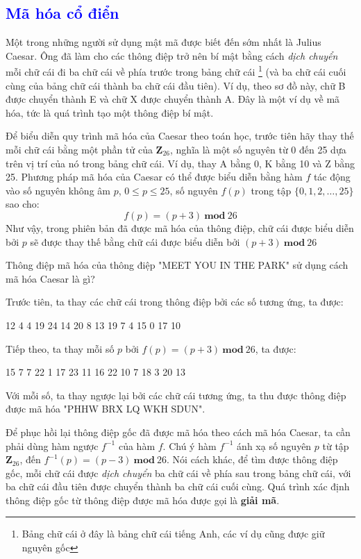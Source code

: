 \textcolor{blue}{\section{Mã hóa cổ điển}}
Một trong những người sử dụng mật mã được biết đến sớm nhất là Julius Caesar. Ông đã làm cho các thông điệp trở nên bí mật bằng cách \textit{dịch chuyển} mỗi chữ cái đi ba chữ cái về phía trước trong bảng chữ cái \footnote{Bảng chữ cái ở đây là bảng chữ cái tiếng Anh, các ví dụ cũng được giữ nguyên gốc} (và ba chữ cái cuối cùng của bảng chữ cái thành ba chữ cái đầu tiên). Ví dụ, theo sơ đồ này, chữ B được chuyển thành E và chữ X được chuyển thành A. Đây là một ví dụ về mã hóa, tức là quá trình tạo một thông điệp bí mật.

Để biểu diễn quy trình mã hóa của Caesar theo toán học, trước tiên hãy thay thế mỗi chữ cái bằng một phần tử của $ \mathbf{Z}_{26} $, nghĩa là một số nguyên từ 0 đến 25 dựa trên vị trí của nó trong bảng chữ cái. Ví dụ, thay A bằng 0, K bằng 10 và Z bằng 25. Phương pháp mã hóa của Caesar có thể được biểu diễn bằng hàm $f$ tác động vào số nguyên không âm $p$, $0 \leq p \leq  25$, số nguyên $f(p)$ trong tập $\{0, 1, 2, \ldots, 25\}$ sao cho:
$$f(p) = (p+3)\ \mathbf{mod}\ 26$$
Như vậy, trong phiên bản đã được mã hóa của thông điệp, chữ cái được biểu diễn bởi $p$ sẽ được thay thế bằng chữ cái được biểu diễn bởi $(p+3)\ \mathbf{mod}\ 26$
\begin{example}
    Thông điệp mã hóa của thông điệp "MEET YOU IN THE PARK" sử dụng cách mã hóa Caesar là gì?
\end{example}
\begin{solution}
    Trước tiên, ta thay các chữ cái trong thông điệp bởi các số tương ứng, ta được:
    \begin{center}
        12 4 4 19 \hspace{0.5cm} 24 14 20 \hspace{0.5cm} 8 13 \hspace{0.5cm} 19 7 4 \hspace{0.5cm} 15 0 17 10
    \end{center}
    Tiếp theo, ta thay mỗi số $p$ bởi $f(p) = (p+3)\ \mathbf{mod}\ 26$, ta được:
    \begin{center}
        15 7 7 22 \hspace{0.5cm} 1 17 23 \hspace{0.5cm} 11 16 \hspace{0.5cm} 22 10 7 \hspace{0.5cm} 18 3 20 13
    \end{center}
    Với mỗi số, ta thay ngược lại bởi các chữ cái tương ứng, ta thu được thông điệp được mã hóa "PHHW BRX LQ WKH SDUN".
\end{solution}
Để phục hồi lại thông điệp gốc đã được mã hóa theo cách mã hóa Caesar, ta cần phải dùng hàm ngược $f^{-1}$ của hàm $f$. Chú ý hàm $f^{-1}$ ánh xạ số nguyên $p$ từ tập $ \mathbf{Z}_{26} $, đến $f^{-1}(p) = (p-3)\ \mathbf{mod}\ 26$. Nói cách khác, để tìm được thông điệp gốc, mỗi chữ cái được \textit{dịch chuyển} ba chữ cái về phía sau trong bảng chữ cái, với ba chữ cái đầu tiên được chuyển thành ba chữ cái cuối cùng. Quá trình xác định thông điệp gốc từ thông điệp được mã hóa được gọi là \textbf{giải mã}.

